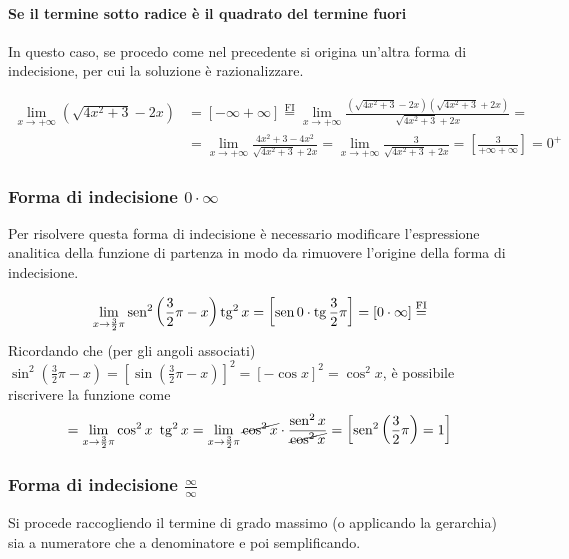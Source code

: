 \documentclass{book}     %
\begin{document}
\paragraph{Se il termine sotto radice è il quadrato del termine fuori}
In questo caso, se procedo come nel precedente si origina un'altra forma di indecisione, per cui la soluzione è razionalizzare.
\begin{ex}
\[\begin{aligned}\lim_{x\to +\infty}\left(\sqrt{4x^2+3}-2x\right)&=[-\infty+\infty]\overset{\mathrm{FI}}{=}\lim_{x\to +\infty}\frac{\left(\sqrt{4x^2+3}-2x\right)\left(\sqrt{4x^2+3}+2x\right)}{\sqrt{4x^2+3}+2x} = \\ &=\lim_{x\to +\infty}\frac{4x^2+3-4x^2}{\sqrt{4x^2+3}+2x}=\lim_{x\to +\infty}\frac{3}{\sqrt{4x^2+3}+2x}=\left[\frac{3}{+\infty+\infty}\right]=0^ +\end{aligned}\]
\end{ex}
\subsubsection{Forma di indecisione $0\cdot \infty$}
Per risolvere questa forma di indecisione è necessario modificare l'espressione analitica della funzione di partenza in modo da rimuovere l'origine della forma di indecisione.
\begin{ex}
\[\lim_{x\to\frac{3}{2}\pi}\operatorname{sen}^2\left(\frac{3}{2}\pi-x\right)\operatorname{tg}^2x=\left[\operatorname{sen} 0 \cdot \operatorname{tg} \frac{3}{2}\pi\right]=[0\cdot \infty]\overset{\mathrm{FI}}{ = }\]
Ricordando che (per gli angoli associati) $\textstyle\sin^2\left(\frac{3}{2}\pi-x\right)= \left[\sin\left(\frac{3}{2}\pi-x\right)\right]^2=[-\cos x]^2=\cos^2 x$, è possibile riscrivere la funzione come \\ 
\[=\lim_{x\to\frac{3}{2}\pi}\cos^2x~\operatorname{tg}^2x = \lim_{x\to\frac{3}{2}\pi} \cancel{\cos^2x}\cdot\frac{\operatorname{sen}^2x}{\cancel{\cos^2x}}=\left[ \operatorname{sen}^2 \left( \frac{3}{2}\pi \right)=1\right]\]
\end{ex}
\subsubsection{Forma di indecisione $\frac{\infty}{\infty}$}
Si procede raccogliendo il termine di grado massimo (o applicando la gerarchia) sia a numeratore che a denominatore e poi semplificando.
\end{document}
